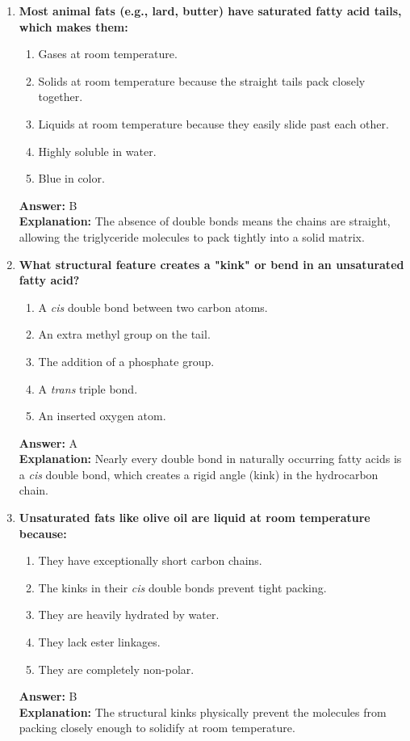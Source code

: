 \documentclass[11pt, a4paper]{article}
\begin{document}
\begin{enumerate}
\item \textbf{Most animal fats (e.g., lard, butter) have saturated fatty acid tails, which makes them:}
\begin{enumerate}[label=\Alph*.]
    \item Gases at room temperature.
    \item Solids at room temperature because the straight tails pack closely together.
    \item Liquids at room temperature because they easily slide past each other.
    \item Highly soluble in water.
    \item Blue in color.
\end{enumerate}
\textbf{Answer:} B \\
\textbf{Explanation:} The absence of double bonds means the chains are straight, allowing the triglyceride molecules to pack tightly into a solid matrix.

\item \textbf{What structural feature creates a "kink" or bend in an unsaturated fatty acid?}
\begin{enumerate}[label=\Alph*.]
    \item A \textit{cis} double bond between two carbon atoms.
    \item An extra methyl group on the tail.
    \item The addition of a phosphate group.
    \item A \textit{trans} triple bond.
    \item An inserted oxygen atom.
\end{enumerate}
\textbf{Answer:} A \\
\textbf{Explanation:} Nearly every double bond in naturally occurring fatty acids is a \textit{cis} double bond, which creates a rigid angle (kink) in the hydrocarbon chain.

\item \textbf{Unsaturated fats like olive oil are liquid at room temperature because:}
\begin{enumerate}[label=\Alph*.]
    \item They have exceptionally short carbon chains.
    \item The kinks in their \textit{cis} double bonds prevent tight packing.
    \item They are heavily hydrated by water.
    \item They lack ester linkages.
    \item They are completely non-polar.
\end{enumerate}
\textbf{Answer:} B \\
\textbf{Explanation:} The structural kinks physically prevent the molecules from packing closely enough to solidify at room temperature.


\end{enumerate}
\end{document}
